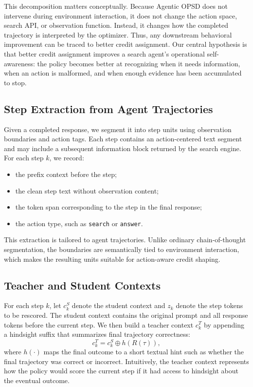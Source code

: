 \documentclass[11pt]{article}
\newcommand{\method}{Agentic OPSD}
\begin{document}
This decomposition matters conceptually. Because \method{} does not intervene during environment interaction, it does not change the action space, search API, or observation function. Instead, it changes how the completed trajectory is interpreted by the optimizer. Thus, any downstream behavioral improvement can be traced to better credit assignment. Our central hypothesis is that better credit assignment improves a search agent's operational self-awareness: the policy becomes better at recognizing when it needs information, when an action is malformed, and when enough evidence has been accumulated to stop.

\subsection{Step Extraction from Agent Trajectories}
Given a completed response, we segment it into step units using observation boundaries and action tags. Each step contains an action-centered text segment and may include a subsequent information block returned by the search engine. For each step $k$, we record:
\begin{itemize}[leftmargin=1.5em]
    \item the prefix context before the step;
    \item the clean step text without observation content;
    \item the token span corresponding to the step in the final response;
    \item the action type, such as \texttt{search} or \texttt{answer}.
\end{itemize}

This extraction is tailored to agent trajectories. Unlike ordinary chain-of-thought segmentation, the boundaries are semantically tied to environment interaction, which makes the resulting units suitable for action-aware credit shaping.

\subsection{Teacher and Student Contexts}
For each step $k$, let $c_k^S$ denote the student context and $z_k$ denote the step tokens to be rescored. The student context contains the original prompt and all response tokens before the current step. We then build a teacher context $c_k^T$ by appending a hindsight suffix that summarizes final trajectory correctness:
\begin{equation}
c_k^T = c_k^S \oplus h(R(\tau)),
\end{equation}
where $h(\cdot)$ maps the final outcome to a short textual hint such as whether the final trajectory was correct or incorrect. Intuitively, the teacher context represents how the policy would score the current step if it had access to hindsight about the eventual outcome.
\end{document}
